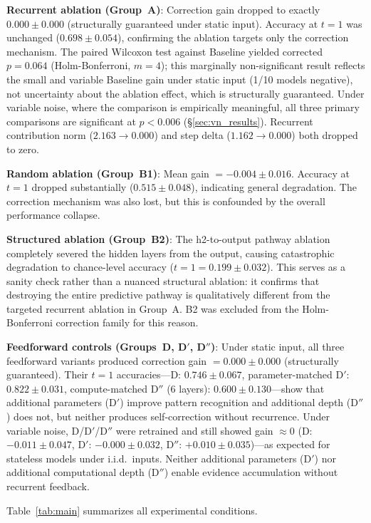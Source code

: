 \documentclass[10pt]{article}
\begin{document}
\textbf{Recurrent ablation (Group~A)}: Correction gain dropped to exactly $0.000 \pm 0.000$ (structurally guaranteed under static input). Accuracy at $t{=}1$ was unchanged ($0.698 \pm 0.054$), confirming the ablation targets only the correction mechanism. The paired Wilcoxon test against Baseline yielded corrected $p = 0.064$ (Holm-Bonferroni, $m = 4$); this marginally non-significant result reflects the small and variable Baseline gain under static input (1/10 models negative), not uncertainty about the ablation effect, which is structurally guaranteed. Under variable noise, where the comparison is empirically meaningful, all three primary comparisons are significant at $p < 0.006$ (\S\ref{sec:vn_results}). Recurrent contribution norm ($2.163 \to 0.000$) and step delta ($1.162 \to 0.000$) both dropped to zero.

\textbf{Random ablation (Group~B1)}: Mean gain $= -0.004 \pm 0.016$. Accuracy at $t{=}1$ dropped substantially ($0.515 \pm 0.048$), indicating general degradation. The correction mechanism was also lost, but this is confounded by the overall performance collapse.

\textbf{Structured ablation (Group~B2)}: The h2-to-output pathway ablation completely severed the hidden layers from the output, causing catastrophic degradation to chance-level accuracy ($t{=}1 = 0.199 \pm 0.032$). This serves as a sanity check rather than a nuanced structural ablation: it confirms that destroying the entire predictive pathway is qualitatively different from the targeted recurrent ablation in Group~A. B2 was excluded from the Holm-Bonferroni correction family for this reason.

\textbf{Feedforward controls (Groups~D, D$'$, D$''$)}: Under static input, all three feedforward variants produced correction gain $= 0.000 \pm 0.000$ (structurally guaranteed). Their $t{=}1$ accuracies---D: $0.746 \pm 0.067$, parameter-matched D$'$: $0.822 \pm 0.031$, compute-matched D$''$ (6 layers): $0.600 \pm 0.130$---show that additional parameters (D$'$) improve pattern recognition and additional depth (D$''$) does not, but neither produces self-correction without recurrence. Under variable noise, D/D$'$/D$''$ were retrained and still showed gain $\approx 0$ (D: $-0.011 \pm 0.047$, D$'$: $-0.000 \pm 0.032$, D$''$: $+0.010 \pm 0.035$)---as expected for stateless models under i.i.d.\ inputs. Neither additional parameters (D$'$) nor additional computational depth (D$''$) enable evidence accumulation without recurrent feedback.

Table~\ref{tab:main} summarizes all experimental conditions.
\end{document}
